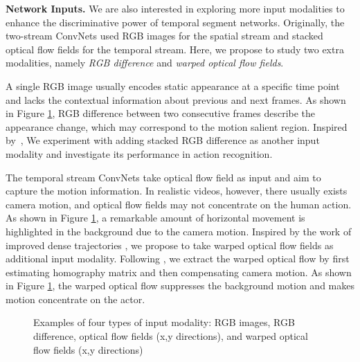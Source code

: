 \documentclass[runningheads]{llncs}
\newcommand{\SEGNET}{temporal segment network}
\begin{document}
\textbf{Network Inputs.}
We are also interested in exploring more input modalities to enhance the discriminative power of \SEGNET s. Originally, the two-stream ConvNets used RGB images for the spatial stream and stacked optical flow fields for the temporal stream.
Here, we propose to study two extra modalities, namely \emph{RGB difference} and \emph{warped optical flow fields}.

A single RGB image usually encodes static appearance at a specific time point and lacks the contextual information about previous and next frames. 
As shown in Figure \ref{fig:ex}, RGB difference between two consecutive frames describe the appearance change, which may correspond to the motion salient region. 
Inspired by~\cite{SunJYS15}, We experiment with adding stacked RGB difference as another input modality and investigate its performance in action recognition. 

The temporal stream ConvNets take optical flow field as input and aim to capture the motion information. In realistic videos, however, there usually exists camera motion, and optical flow fields may not concentrate on the human action. As shown in Figure \ref{fig:ex}, a remarkable amount of horizontal movement is highlighted in the background due to the camera motion. Inspired by the work of improved dense trajectories \cite{WangS13a}, we propose to take warped optical flow fields as additional input modality.
Following \cite{WangS13a}, we extract the warped optical flow by first estimating homography matrix and then compensating camera motion.
As shown in Figure \ref{fig:ex}, the warped optical flow suppresses the background motion and makes motion concentrate on the actor.

\begin{figure}[t]
	\caption{Examples of four types of input modality: RGB images, RGB difference, optical flow fields (x,y directions), and warped optical flow fields (x,y directions)}
	\label{fig:ex}
\end{figure}
\end{document}
